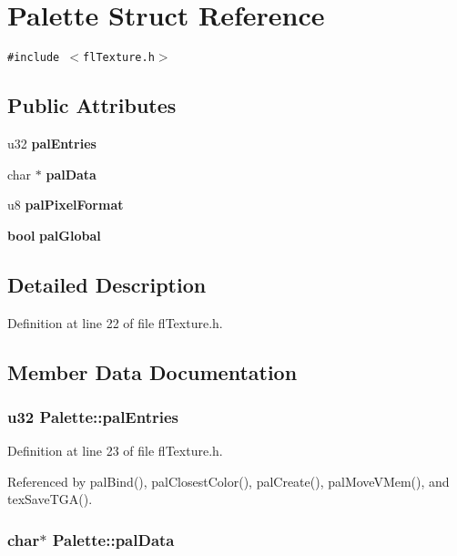 \section{Palette Struct Reference}
\label{structPalette}
{\tt \#include $<$fl\-Texture.h$>$}

\subsection*{Public Attributes}
\begin{CompactItemize}
\item 
u32 {\bf pal\-Entries}
\item 
char $\ast$ {\bf pal\-Data}
\item 
u8 {\bf pal\-Pixel\-Format}
\item 
{\bf bool} {\bf pal\-Global}
\end{CompactItemize}


\subsection{Detailed Description}




Definition at line 22 of file fl\-Texture.h.

\subsection{Member Data Documentation}
\subsubsection{\setlength{\rightskip}{0pt plus 5cm}u32 {\bf Palette::pal\-Entries}}\label{structPalette_c513f46c6a052fc006de8d56f9469558}




Definition at line 23 of file fl\-Texture.h.

Referenced by pal\-Bind(), pal\-Closest\-Color(), pal\-Create(), pal\-Move\-VMem(), and tex\-Save\-TGA().
\subsubsection{\setlength{\rightskip}{0pt plus 5cm}char$\ast$ {\bf Palette::pal\-Data}}\label{structPalette_fe95a9fca04cb4066dc4651cd604c7b0}




